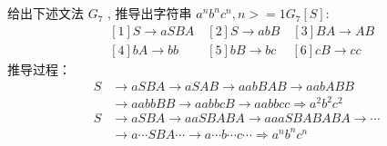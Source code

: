 \documentclass{article}
\begin{document}
\subsection{}%
\noindent
给出下述文法 $G_7$ , 推导出字符串 $a^nb^nc^n,n>=1 G_7[S]:$
\begin{align*}
       & [1] S \rightarrow aSBA \quad [2] S \rightarrow abB \quad [3] BA \rightarrow AB      \\
       & [4] bA \rightarrow bb  \qquad \ [5] bB \rightarrow bc \quad \ [6] cB \rightarrow cc
\end{align*}
推导过程：
\begin{align*}
      S & \rightarrow aSBA \rightarrow aSAB \rightarrow aabBAB \rightarrow aabABB                 \\
        & \rightarrow aabbBB \rightarrow aabbcB \rightarrow aabbcc \Rightarrow a^2b^2c^2          \\
      S & \rightarrow aSBA \rightarrow aaSBABA \rightarrow aaaSBABABA \rightarrow \cdots          \\
        & \rightarrow a\cdots SBA\cdots \rightarrow a\cdots b\cdots c\cdots \Rightarrow a^nb^nc^n
\end{align*}
\clearpage
\end{document}
